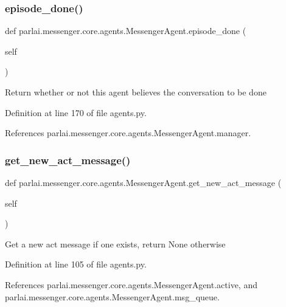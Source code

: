 \subsubsection{\texorpdfstring{episode\+\_\+done()}{episode\_done()}}
{\footnotesize\ttfamily def parlai.\+messenger.\+core.\+agents.\+Messenger\+Agent.\+episode\+\_\+done (\begin{DoxyParamCaption}\item[{}]{self }\end{DoxyParamCaption})}

\begin{DoxyVerb}Return whether or not this agent believes the conversation to
be done\end{DoxyVerb}
 

Definition at line 170 of file agents.\+py.



References parlai.\+messenger.\+core.\+agents.\+Messenger\+Agent.\+manager.

\mbox{\label{classparlai_1_1messenger_1_1core_1_1agents_1_1MessengerAgent_afc5f00a73bd86a16176ca5bcc819a51b}} 
\subsubsection{\texorpdfstring{get\+\_\+new\+\_\+act\+\_\+message()}{get\_new\_act\_message()}}
{\footnotesize\ttfamily def parlai.\+messenger.\+core.\+agents.\+Messenger\+Agent.\+get\+\_\+new\+\_\+act\+\_\+message (\begin{DoxyParamCaption}\item[{}]{self }\end{DoxyParamCaption})}

\begin{DoxyVerb}Get a new act message if one exists, return None otherwise\end{DoxyVerb}
 

Definition at line 105 of file agents.\+py.



References parlai.\+messenger.\+core.\+agents.\+Messenger\+Agent.\+active, and parlai.\+messenger.\+core.\+agents.\+Messenger\+Agent.\+msg\+\_\+queue.



